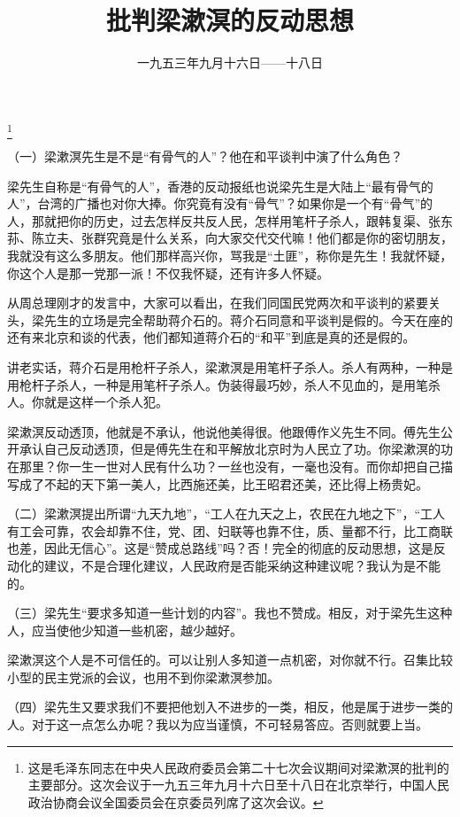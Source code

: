 
\title{批判梁漱溟的反动思想}
\date{一九五三年九月十六日——十八日}
\thanks{这是毛泽东同志在中央人民政府委员会第二十七次会议期间对梁漱溟的批判的主要部分。这次会议于一九五三年九月十六日至十八日在北京举行，中国人民政治协商会议全国委员会在京委员列席了这次会议。}
\maketitle


（一）梁漱溟先生是不是“有骨气的人”？他在和平谈判中演了什么角色？

梁先生自称是“有骨气的人”，香港的反动报纸也说梁先生是大陆上“最有骨气的人”，台湾的广播也对你大捧。你究竟有没有“骨气”？如果你是一个有“骨气”的人，那就把你的历史，过去怎样反共反人民，怎样用笔杆子杀人，跟韩复渠、张东荪、陈立夫、张群究竟是什么关系，向大家交代交代嘛！他们都是你的密切朋友，我就没有这么多朋友。他们那样高兴你，骂我是“土匪”，称你是先生！我就怀疑，你这个人是那一党那一派！不仅我怀疑，还有许多人怀疑。

从周总理刚才的发言中，大家可以看出，在我们同国民党两次和平谈判的紧要关头，梁先生的立场是完全帮助蒋介石的。蒋介石同意和平谈判是假的。今天在座的还有来北京和谈的代表，他们都知道蒋介石的“和平”到底是真的还是假的。

讲老实话，蒋介石是用枪杆子杀人，梁漱溟是用笔杆子杀人。杀人有两种，一种是用枪杆子杀人，一种是用笔杆子杀人。伪装得最巧妙，杀人不见血的，是用笔杀人。你就是这样一个杀人犯。

梁漱溟反动透顶，他就是不承认，他说他美得很。他跟傅作义先生不同。傅先生公开承认自己反动透顶，但是傅先生在和平解放北京时为人民立了功。你梁漱溟的功在那里？你一生一世对人民有什么功？一丝也没有，一毫也没有。而你却把自己描写成了不起的天下第一美人，比西施还美，比王昭君还美，还比得上杨贵妃。

（二）梁漱溟提出所谓“九天九地”，“工人在九天之上，农民在九地之下”，“工人有工会可靠，农会却靠不住，党、团、妇联等也靠不住，质、量都不行，比工商联也差，因此无信心”。这是“赞成总路线”吗？否！完全的彻底的反动思想，这是反动化的建议，不是合理化建议，人民政府是否能采纳这种建议呢？我认为是不能的。

（三）梁先生“要求多知道一些计划的内容”。我也不赞成。相反，对于梁先生这种人，应当使他少知道一些机密，越少越好。

梁漱溟这个人是不可信任的。可以让别人多知道一点机密，对你就不行。召集比较小型的民主党派的会议，也用不到你梁漱溟参加。

（四）梁先生又要求我们不要把他划入不进步的一类，相反，他是属于进步一类的人。对于这一点怎么办呢？我以为应当谨慎，不可轻易答应。否则就要上当。

